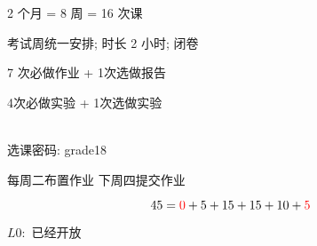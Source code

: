 
\begin{frame}{}
  \begin{center}
    {\large 2 个月 = 8 周 = 16 次课}
  \end{center}

\end{frame}

\begin{frame}{}
  \begin{center}
     考试周统一安排; 时长 2 小时; 闭卷
    \vspace{1.00cm}

     7 次必做作业 + 1次选做报告 

    \vspace{1.00cm}
     4次必做实验 + 1次选做实验 
  \end{center}
\end{frame}

\begin{frame}{}
  \begin{center}
     \\[10pt]
    选课密码: grade18

    \vspace{1.50cm}
    每周二布置作业 \qquad 下周四提交作业
  \end{center}
\end{frame}

\begin{frame}{}
  \[
    45 = \textcolor{red}{0} + 5 + 15 + 15 + 10 + \textcolor{red}{5}
  \]

  \vspace{0.30cm}

  \begin{center}

    \vspace{0.80cm}
    $L0:$ 已经开放
  \end{center}
\end{frame}

% 

